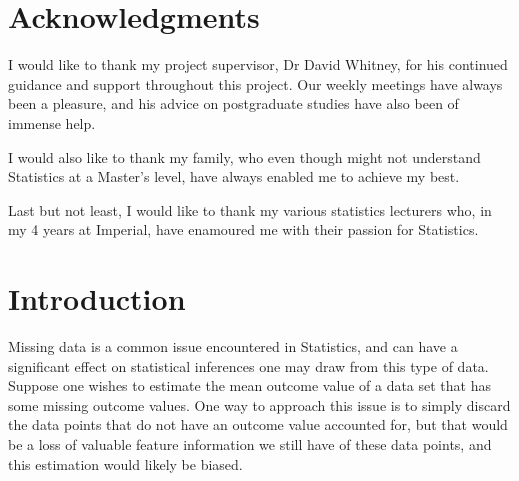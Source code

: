 \documentclass[12pt,twoside]{article}
\date{October 2020}
\begin{document}



\clearpage{\pagestyle{empty}\cleardoublepage}
\setcounter{page}{1}
\pagestyle{fancy}
\setlength{\parindent}{5ex}
\begin{abstract}


\end{abstract}

\clearpage
\section*{Acknowledgments}
I would like to thank my project supervisor, Dr David Whitney, for his continued guidance and support throughout this project. Our weekly meetings have always been a pleasure, and his advice on postgraduate studies have also been of immense help. 

I would also like to thank my family, who even though might not understand Statistics at a Master's level, have always enabled me to achieve my best.

Last but not least, I would like to thank my various statistics lecturers who, in my 4 years at Imperial, have enamoured me with their passion for Statistics.

\clearpage{\pagestyle{empty}\cleardoublepage}

\tableofcontents 


\clearpage
{}
\setcounter{page}{1}
\fancyhead[L]{\textsl{\leftmark}}

\section{Introduction} 

Missing data is a common issue encountered in Statistics, and can have a significant effect on statistical inferences one may draw from this type of data. Suppose one wishes to estimate the mean outcome value of a data set that has some missing outcome values. One way to approach this issue is to simply discard the data points that do not have an outcome value accounted for, but that would be a loss of valuable feature information we still have of these data points, and this estimation would likely be biased.
\end{document}
